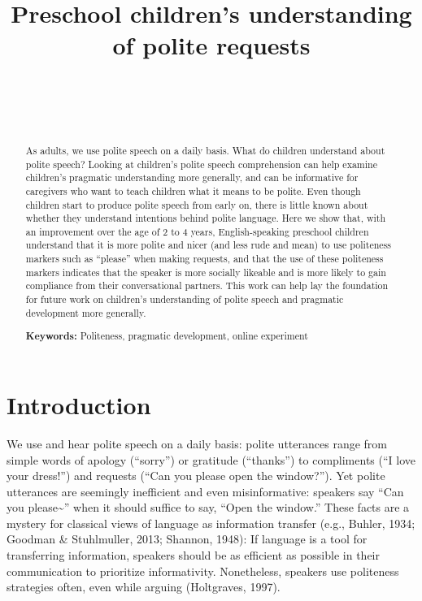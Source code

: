 \documentclass[10pt, letterpaper]{article}
\title{Preschool children's understanding of polite requests}
\author{{\large \bf } \\ \texttt{} \\  \\}
\begin{document}
\maketitle

\begin{abstract}
As adults, we use polite speech on a daily basis. What do children
understand about polite speech? Looking at children's polite speech
comprehension can help examine children's pragmatic understanding more
generally, and can be informative for caregivers who want to teach
children what it means to be polite. Even though children start to
produce polite speech from early on, there is little known about whether
they understand intentions behind polite language. Here we show that,
with an improvement over the age of 2 to 4 years, English-speaking
preschool children understand that it is more polite and nicer (and less
rude and mean) to use politeness markers such as ``please'' when making
requests, and that the use of these politeness markers indicates that
the speaker is more socially likeable and is more likely to gain
compliance from their conversational partners. This work can help lay
the foundation for future work on children's understanding of polite
speech and pragmatic development more generally.

\textbf{Keywords:}
Politeness, pragmatic development, online experiment
\end{abstract}

\section{Introduction}\label{introduction}

We use and hear polite speech on a daily basis: polite utterances range
from simple words of apology (``sorry'') or gratitude (``thanks'') to
compliments (``I love your dress!'') and requests (``Can you please open
the window?''). Yet polite utterances are seemingly inefficient and even
misinformative: speakers say ``Can you please\textasciitilde{}'' when it
should suffice to say, ``Open the window.'' These facts are a mystery
for classical views of language as information transfer (e.g., Buhler,
1934; Goodman \& Stuhlmuller, 2013; Shannon, 1948): If language is a
tool for transferring information, speakers should be as efficient as
possible in their communication to prioritize informativity.
Nonetheless, speakers use politeness strategies often, even while
arguing (Holtgraves, 1997).
\end{document}
